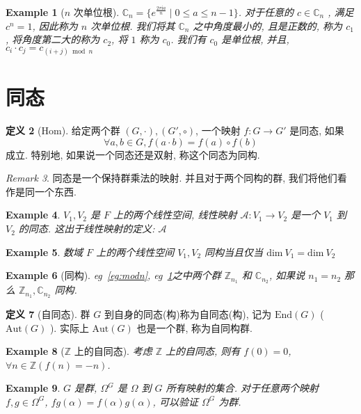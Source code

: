 \documentclass[12pt]{ctexart}
\theoremstyle{definition}
\theoremstyle{definition}
\newtheorem{definition}{定义}[section]
\theoremstyle{plain}
\newtheorem{exam}[definition]{Example}
\theoremstyle{remark}
\newtheorem{remark}[definition]{Remark}
\begin{document}
\begin{exam}[\(n\) 次单位根]\label{eg:rootn}
	\(\mathbb{C} _{n} = \{ e ^{\frac{2\pi \mathrm i a}{n}} \mid  0 \le a \le n-1\}\). 
	对于任意的 \(c \in \mathbb{C}_{n}\) , 满足 \(c ^{n} = 1\), 因此称为 \(n\) 次单位根. 我们将其 \(\mathbb{C}_{n}\) 之中角度最小的, 且是正数的, 称为 \(c_{1}\), 将角度第二大的称为 \(c_{2}\), 将 \(1\) 称为 \(c_{0}\). 我们有 \(c_{0}\) 是单位根, 并且, \(c_{i} \cdot c _{j} = c _{(i+j) \bmod{n}}\)
\end{exam}


\section{同态}\label{sec:hom}
\begin{definition}[Hom]
给定两个群 \( (G , \cdot ) , ( G' , \circ )\), 一个映射 \(f \colon G \to G '\) 是同态, 如果
\begin{equation}
\forall a , b \in G, f (a \cdot b ) = f(a) \circ f(b)
\end{equation}
成立. 特别地, 如果说一个同态还是双射, 称这个同态为同构. 
\end{definition}

\begin{remark}
同态是一个保持群乘法的映射. 并且对于两个同构的群, 我们将他们看作是同一个东西. 
\end{remark}
\begin{exam}
	\(V_{1} ,V_{2} \) 是 \(F\) 上的两个线性空间, 线性映射 \(\mathscr {A} \colon V_{1} \to V_{2}\) 是一个 \(V_{1} \) 到 \(V_{2} \) 的同态. 这出于线性映射的定义: \(\mathscr  A\)
\end{exam}
\begin{exam}
	数域 \(F\) 上的两个线性空间 \(V _{1} , V_{2}\) 同构当且仅当 \(\text{dim}\ V_{1} = \text{dim} \ V_{2}\)
\end{exam}
\begin{exam}[同构]
	eg~\ref{eg:modn}, eg~\ref{eg:rootn}之中两个群 \(\mathbb{Z}_{n_{1}} \) 和 \(\mathbb{C}_{n_{2}}\), 如果说 \(n_{1} = n_{2}\) 那么 \(\mathbb{Z} _{n_{1}} , \mathbb{C} _{n_{2}}\) 同构. 
\end{exam}

\begin{definition}[自同态]\label{def:自同态}
	群 \(G\) 到自身的同态(构)称为自同态(构), 记为 \(\text{End} (G)\) ( \(\text{Aut} (G)\) ). 实际上 \(\text{Aut} (G)\) 也是一个群, 称为自同构群. 
\end{definition}

\begin{exam}[\(\mathbb{Z}\) 上的自同态]
考虑 \(\mathbb{Z}\) 上的自同态, 则有 \(f (0) = 0 \), \(\forall n\in \mathbb{Z} (f (n ) = - n) \).
\end{exam}

\begin{exam}
\(G\) 是群, \(\Omega ^{G}\) 是 \(\Omega\) 到 \(G\) 所有映射的集合. 
对于任意两个映射 \(f , g \in \Omega ^{G}\), \(fg ( \alpha ) = f (\alpha ) g (\alpha ) \), 可以验证 \(\Omega ^{G}\) 为群.
\end{exam}
\end{document}

